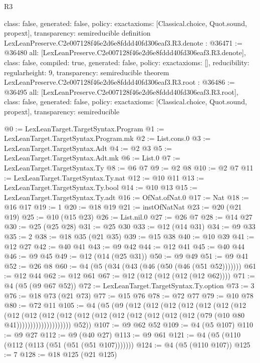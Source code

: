 \begin{lexlean}{R3}
\begin{coremodule}
{  class: false,
  generated: false,
  policy: exact{axioms: [Classical.choice, Quot.sound, propext]},
  transparency: semireducible
}
definition LexLeanPreserve.C2e007128f46e2d6e8fddd40fd306eaf3.R3.denote : @36471 := @36480 {
  all: [LexLeanPreserve.C2e007128f46e2d6e8fddd40fd306eaf3.R3.denote],
  class: false,
  compiled: true,
  generated: false,
  policy: exact{axioms: []},
  reducibility: regular{height: 9},
  transparency: semireducible
}
theorem LexLeanPreserve.C2e007128f46e2d6e8fddd40fd306eaf3.R3.root : @36486 := @36495 {
  all: [LexLeanPreserve.C2e007128f46e2d6e8fddd40fd306eaf3.R3.root],
  class: false,
  generated: false,
  policy: exact{axioms: [Classical.choice, Quot.sound, propext]},
  transparency: semireducible
}

@0 := LexLeanTarget.TargetSyntax.Program
@1 := LexLeanTarget.TargetSyntax.Program.mk
@2 := List.cons.{0}
@3 := LexLeanTarget.TargetSyntax.Adt
@4 := @2 @3
@5 := LexLeanTarget.TargetSyntax.Adt.mk
@6 := List.{0}
@7 := LexLeanTarget.TargetSyntax.Ty
@8 := @6 @7
@9 := @2 @8
@10 := @2 @7
@11 := LexLeanTarget.TargetSyntax.Ty.nat
@12 := @10 @11
@13 := LexLeanTarget.TargetSyntax.Ty.bool
@14 := @10 @13
@15 := LexLeanTarget.TargetSyntax.Ty.adt
@16 := OfNat.ofNat.{0}
@17 := Nat
@18 := @16 @17
@19 := 1
@20 := @18 @19
@21 := instOfNatNat
@23 := @20 (@21 @19)
@25 := @10 (@15 @23)
@26 := List.nil.{0}
@27 := @26 @7
@28 := @14 @27
@30 := @25 (@25 @28)
@31 := @25 @30
@33 := @12 (@14 @31)
@34 := @9 @33
@35 := 2
@38 := @18 @35 (@21 @35)
@39 := @15 @38
@40 := @10 @39
@41 := @12 @27
@42 := @40 @41
@43 := @9 @42
@44 := @12 @41
@45 := @40 @44
@46 := @9 @45
@49 := @12 (@14 (@25 @31))
@50 := @9 @49
@51 := @9 @41
@52 := @26 @8
@60 := @4 (@5 (@34 (@43 (@46 (@50 (@46 (@51 @52)))))))
@61 := @12 @44
@62 := @12 @61
@67 := @12 (@12 (@12 (@12 (@12 @62))))
@71 := @4 (@5 (@9 @67 @52))
@72 := LexLeanTarget.TargetSyntax.Ty.option
@73 := 3
@76 := @18 @73 (@21 @73)
@77 := @15 @76
@78 := @72 @77
@79 := @10 @78
@80 := @72 @11
@105 := @4
    (@5
      (@9
        (@12
          (@12
            (@12
              (@12
                (@12
                  (@12
                    (@12
                      (@12
                        (@12
                          (@12
                            (@12
                              (@12
                                (@12 (@12 (@12 (@12 (@12 (@12 (@79 (@10 @80 @41))))))))))))))))))))
        @52))
@107 := @9 @62 @52
@109 := @4 (@5 @107)
@110 := @9 @27
@112 := @9 (@40 @27)
@113 := @9 @61
@121 := @4 (@5 (@110 (@112 (@113 (@51 (@51 (@51 @107)))))))
@124 := @4 (@5 (@110 @107))
@125 := 7
@128 := @18 @125 (@21 @125)

\end{coremodule}
\end{lexlean}
